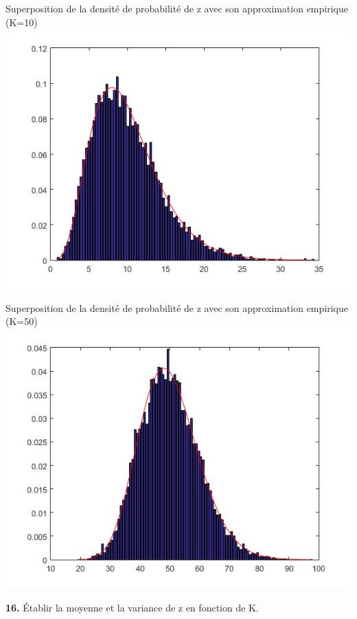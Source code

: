 \documentclass[12pt]{article}
\begin{document}
\clearpage

\begin{flushleft}
Superposition de la densité de probabilité de z avec son approximation empirique (K=10)
\includegraphics{3_15_10.PNG}
\end{flushleft}

\clearpage

\begin{flushleft}
Superposition de la densité de probabilité de z avec son approximation empirique (K=50)
\includegraphics{3_15_50.PNG}
\end{flushleft}

\smallbreak

\textbf{16.} Établir la moyenne et la variance de z en fonction de K.
\end{document}
